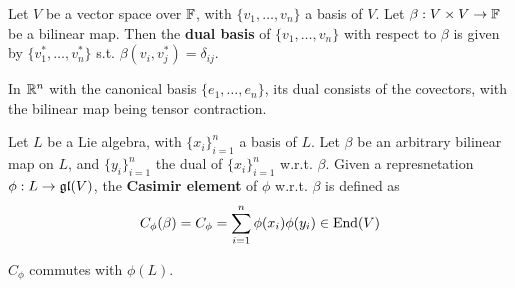 \documentclass{article}
\begin{document}
\begin{definition}
    Let $V$ be a vector space over $\mathbb{F}$, with $\{ v_1, \dots, v_n \}$ a basis of $V$. Let $\beta: V \times V \to \mathbb{F}$ be a bilinear map. Then the \textbf{dual basis} of $\{ v_1, \dots, v_n \}$ with respect to $\beta$ is given by $\{ v_1^*, \dots, v_n^* \}$ s.t. $\beta(v_i, v_j^*) = \delta_{ij}$.
\end{definition}
\nogap
\begin{remark}
    In $\mathbb{R}^n$ with the canonical basis $\{e_1, \dots, e_n\}$, its dual consists of the covectors, with the bilinear map being tensor contraction.
\end{remark}

\begin{definition}
    Let $L$ be a Lie algebra, with $\{x_i\}_{i = 1}^n$ a basis of $L$. Let $\beta$ be an arbitrary bilinear map on $L$, and $\{y_i\}_{i = 1}^n$ the dual of $\{x_i\}_{i = 1}^n$ w.r.t. $\beta$. Given a represnetation $\phi: L \to \mathfrak{gl}(V)$, the \textbf{Casimir element} of $\phi$ w.r.t. $\beta$ is defined as
    \[
        C_{\phi}(\beta) = C_{\phi} = \sum_{i = 1}^n \phi(x_i) \phi(y_i) \in \mathrm{End}(V)
    \]
\end{definition}

\begin{lemma}
    $C_{\phi}$ commutes with $\phi(L)$.
\end{lemma}
\end{document}
